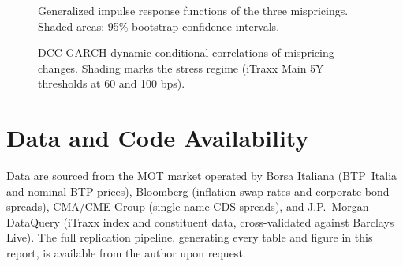 \begin{figure}[p]
\centering
{}
\caption{Generalized impulse response functions of the three mispricings.
Shaded areas: 95\% bootstrap confidence intervals.}
\end{figure}

\begin{figure}[p]
\centering
{}
\caption{DCC-GARCH dynamic conditional correlations of mispricing changes.
Shading marks the stress regime (iTraxx Main 5Y thresholds at 60 and 100 bps).}
\end{figure}

\clearpage
\section{Data and Code Availability}\label{app:data}

Data are sourced from the MOT market operated by Borsa Italiana (BTP~Italia
and nominal BTP prices), Bloomberg (inflation swap rates and corporate bond
spreads), CMA/CME Group (single-name CDS spreads), and J.P.~Morgan DataQuery
(iTraxx index and constituent data, cross-validated against Barclays Live).
The full replication pipeline, generating every table and figure in this
report, is available from the author upon request.


